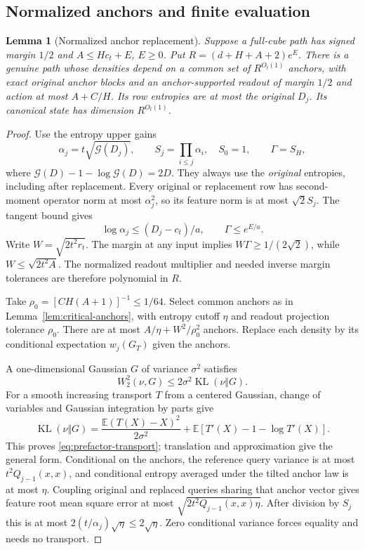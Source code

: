 \documentclass[11pt]{article}
\newtheorem{lemma}[theorem]{Lemma}
\theoremstyle{remark}
\newcommand{\E}{\mathbb E}
\newcommand{\KL}{\operatorname{KL}}
\newcommand{\Gain}{\mathcal G}
\begin{document}
\subsection{Normalized anchors and finite evaluation}

\begin{lemma}[Normalized anchor replacement]
\label{lem:prefactor-anchors}
Suppose a full-cube path has signed margin $1/2$ and
$A\le Hc_t+E$, $E\ge0$. Put $R=(d+H+A+2)e^E$.
There is a genuine path whose densities depend on a common set
of $R^{O_t(1)}$ anchors, with exact original anchor blocks and
an anchor-supported readout of margin $1/2$ and action at most
$A+C/H$. Its row entropies are at most the original $D_j$.
Its canonical state has dimension $R^{O_t(1)}$.
\end{lemma}
\begin{proof}
Use the entropy upper gains
\[
 \alpha_j=t\sqrt{\Gain(D_j)},\qquad
 S_j=\prod_{i\le j}\alpha_i,\quad S_0=1,\qquad \Gamma=S_H,
\]
where $\Gain(D)-1-\log\Gain(D)=2D$. They always use the
\emph{original} entropies, including after replacement.
Every original or replacement row has second-moment operator
norm at most $\alpha_j^2$, so its feature norm is at most
$\sqrt2S_j$. The tangent bound gives
\[
 \log\alpha_j\le(D_j-c_t)/a,\qquad \Gamma\le e^{E/a}.
\]
Write $W=\sqrt{2t^2r_t}$. The margin at any input implies
$W\Gamma\ge1/(2\sqrt2)$, while $W\le\sqrt{2t^2A}$.
The normalized readout multiplier and needed inverse margin
tolerances are therefore polynomial in $R$.

Take $\rho_0=[CH(A+1)]^{-1}\le1/64$. Select common anchors
as in Lemma~\ref{lem:critical-anchors}, with entropy cutoff
$\eta$ and readout projection tolerance $\rho_0$. There are
at most $A/\eta+W^2/\rho_0^2$ anchors. Replace each density
by its conditional expectation $w_j(G_T)$ given the anchors.

A one-dimensional Gaussian $G$ of variance $\sigma^2$ satisfies
\begin{equation}
 W_2^2(\nu,G)\le2\sigma^2\KL(\nu\Vert G).
 \label{eq:prefactor-transport}
\end{equation}
For a smooth increasing transport $T$ from a centered Gaussian,
change of variables and Gaussian integration by parts give
\[
 \KL(\nu\Vert G)=
 \frac{\E(T(X)-X)^2}{2\sigma^2}
 +\E[T'(X)-1-\log T'(X)].
\]
This proves \eqref{eq:prefactor-transport}; translation and
approximation give the general form. Conditional on the anchors,
the reference query variance is at most $t^2Q_{j-1}(x,x)$,
and conditional entropy averaged under the tilted anchor law is
at most $\eta$. Coupling original and replaced queries sharing
that anchor vector gives feature root mean square error at most
$\sqrt{2t^2Q_{j-1}(x,x)\eta}$. After division by $S_j$ this is
at most $2(t/\alpha_j)\sqrt\eta\le2\sqrt\eta$.
Zero conditional variance forces equality and needs no transport.


\end{proof}
\end{document}
